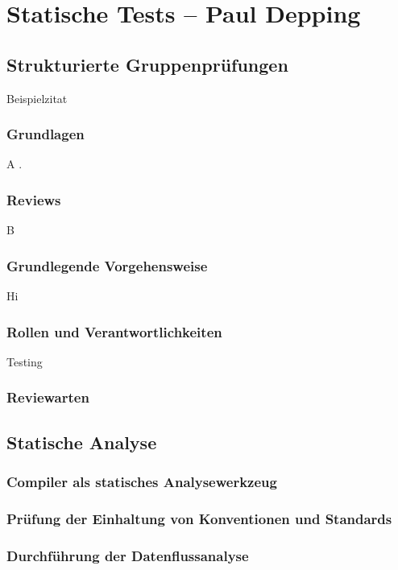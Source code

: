 \documentclass[	%
		fontsize=11pt,  %
		a4paper,	    %
		german,		%
		sans,			%
		f4,				%
	]{HsH-report}		%
\begin{document}
\chapter{Statische Tests -- Paul Depping} \label{chap: static}
	\section{Strukturierte Gruppenprüfungen}
		Beispielzitat \cite{fagan:advances}
		\subsection{Grundlagen}
			A \cite{dpunkt:basiswissensoftwaretest}.
		\subsection{Reviews}
			B \cite{fagan:design}
			\lipsum[1]
		\subsection{Grundlegende Vorgehensweise}
			Hi \cite{freedman:reviews}
			\lipsum[1]
		\subsection{Rollen und Verantwortlichkeiten}
			Testing \cite{hanser:qualität}
			\lipsum[1]
		\subsection{Reviewarten}

	\section{Statische Analyse}
		\lipsum[1-2]
		\subsection{Compiler als statisches Analysewerkzeug}
			\lipsum[1]
		\subsection{Prüfung der Einhaltung von Konventionen und Standards}
			\lipsum[1]
		\subsection{Durchführung der Datenflussanalyse}
			\lipsum[1]
\end{document}
